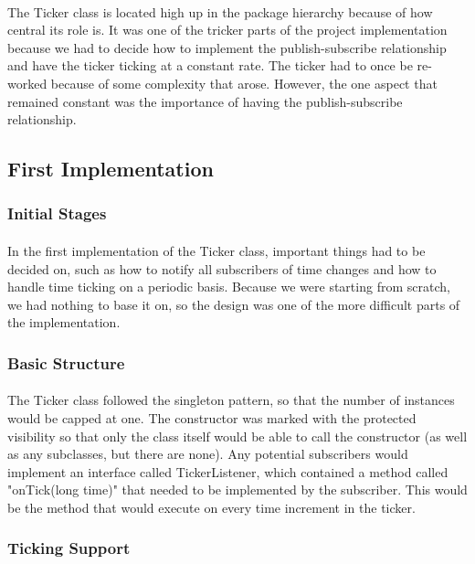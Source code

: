 \documentclass[a4paper,11pt,titlepage]{article}
\begin{document}
\paragraph{}
The Ticker class is located high up in the package hierarchy because of how central its role is. It was one of the tricker parts of the project implementation because we had to decide how to implement the publish-subscribe relationship and have the ticker ticking at a constant rate. The ticker had to once be re-worked because of some complexity that arose. However, the one aspect that remained constant was the importance of having the publish-subscribe relationship.
\subsection{First Implementation}
\subsubsection{Initial Stages}
\paragraph{}
In the first implementation of the Ticker class, important things had to be decided on, such as how to notify all subscribers of time changes and how to handle time ticking on a periodic basis. Because we were starting from scratch, we had nothing to base it on, so the design was one of the more difficult parts of the implementation.
\subsubsection{Basic Structure}
\paragraph{}
The Ticker class followed the singleton pattern, so that the number of instances would be capped at one. The constructor was marked with the protected visibility so that only the class itself would be able to call the constructor (as well as any subclasses, but there are none). Any potential subscribers would implement an interface called TickerListener, which contained a method called "onTick(long time)" that needed to be implemented by the subscriber. This would be the method that would execute on every time increment in the ticker.
\subsubsection{Ticking Support}
\end{document}
